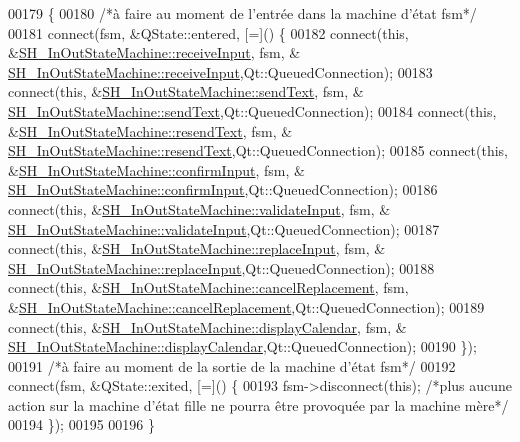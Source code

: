 \begin{DoxyCode}
00179 \{
00180     \textcolor{comment}{/*à faire au moment de l'entrée dans la machine d'état fsm*/}
00181     connect(fsm, &QState::entered, [=]() \{
00182         connect(\textcolor{keyword}{this}, &\hyperlink{classSH__InOutStateMachine_a037ed5e13ecfae2123a8d4940292e410}{SH\_InOutStateMachine::receiveInput}, fsm, &
      \hyperlink{classSH__InOutStateMachine_a037ed5e13ecfae2123a8d4940292e410}{SH\_InOutStateMachine::receiveInput},Qt::QueuedConnection);
00183         connect(\textcolor{keyword}{this}, &\hyperlink{classSH__InOutStateMachine_a5e7f5958bae31696b6a8deab94ad2b4f}{SH\_InOutStateMachine::sendText}, fsm, &
      \hyperlink{classSH__InOutStateMachine_a5e7f5958bae31696b6a8deab94ad2b4f}{SH\_InOutStateMachine::sendText},Qt::QueuedConnection);
00184         connect(\textcolor{keyword}{this}, &\hyperlink{classSH__InOutStateMachine_a526822c66b46aa0cd81ba4473fa5573f}{SH\_InOutStateMachine::resendText}, fsm, &
      \hyperlink{classSH__InOutStateMachine_a526822c66b46aa0cd81ba4473fa5573f}{SH\_InOutStateMachine::resendText},Qt::QueuedConnection);
00185         connect(\textcolor{keyword}{this}, &\hyperlink{classSH__InOutStateMachine_a7f7d9c9300c1d05bce2c26029f28cc31}{SH\_InOutStateMachine::confirmInput}, fsm, &
      \hyperlink{classSH__InOutStateMachine_a7f7d9c9300c1d05bce2c26029f28cc31}{SH\_InOutStateMachine::confirmInput},Qt::QueuedConnection);
00186         connect(\textcolor{keyword}{this}, &\hyperlink{classSH__InOutStateMachine_aec1b3fef3c1f82499aa1f73beaecd08a}{SH\_InOutStateMachine::validateInput}, fsm, &
      \hyperlink{classSH__InOutStateMachine_aec1b3fef3c1f82499aa1f73beaecd08a}{SH\_InOutStateMachine::validateInput},Qt::QueuedConnection);
00187         connect(\textcolor{keyword}{this}, &\hyperlink{classSH__InOutStateMachine_a9fa5db44086de2576c812f631aa4f60a}{SH\_InOutStateMachine::replaceInput}, fsm, &
      \hyperlink{classSH__InOutStateMachine_a9fa5db44086de2576c812f631aa4f60a}{SH\_InOutStateMachine::replaceInput},Qt::QueuedConnection);
00188         connect(\textcolor{keyword}{this}, &\hyperlink{classSH__InOutStateMachine_a035d37535533d4805fe2606f38c19380}{SH\_InOutStateMachine::cancelReplacement}, fsm,
       &\hyperlink{classSH__InOutStateMachine_a035d37535533d4805fe2606f38c19380}{SH\_InOutStateMachine::cancelReplacement},Qt::QueuedConnection);
00189         connect(\textcolor{keyword}{this}, &\hyperlink{classSH__InOutStateMachine_ab3a12d1f9b658d8ffdc17669a6c065f2}{SH\_InOutStateMachine::displayCalendar}, fsm, &
      \hyperlink{classSH__InOutStateMachine_ab3a12d1f9b658d8ffdc17669a6c065f2}{SH\_InOutStateMachine::displayCalendar},Qt::QueuedConnection);
00190     \});
00191     \textcolor{comment}{/*à faire au moment de la sortie de la machine d'état fsm*/}
00192     connect(fsm, &QState::exited, [=]() \{
00193         fsm->disconnect(\textcolor{keyword}{this}); \textcolor{comment}{/*plus aucune action sur la machine d'état fille ne pourra être provoquée
       par la machine mère*/}
00194     \});
00195 
00196 \}
\end{DoxyCode}



